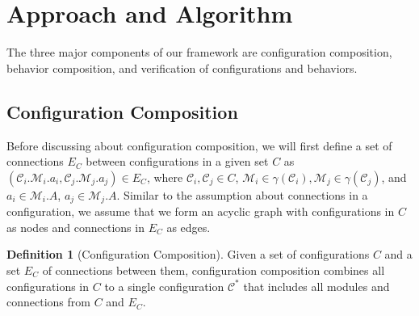 \documentclass[conference]{IEEEtran}
\theoremstyle{definition}
\newtheorem{definition}{Definition}[section]
\begin{document}
\section{Approach and Algorithm}
\label{sec:approach}
The three major components of our framework are configuration composition, behavior
composition, and verification of configurations and behaviors. 
\subsection{Configuration Composition} \label{sec:conf_composition}

Before discussing about configuration composition, we will first define a set of connections $E_C$ between configurations in a given set $C$ as $(\mathcal{C}_i.\mathcal{M}_i.a_i, \mathcal{C}_j.\mathcal{M}_j.a_j) \in E_C$, where $\mathcal{C}_{i},\mathcal{C}_j\in C$, $\mathcal{M}_i \in \gamma(\mathcal{C}_i), \mathcal{M}_j \in \gamma(\mathcal{C}_j)$, and $a_i\in \mathcal{M}_i.A$, $a_j\in \mathcal{M}_j.A$. Similar to the assumption about connections in a configuration, we assume that we form an
acyclic graph with configurations in $C$ as nodes and connections in $E_C$ as edges.
\begin{definition}[Configuration Composition]
Given a set of configurations $C$ %
and a set $E_C$ of connections between them, configuration composition
combines all configurations in $C$ to a single configuration $\mathcal{C}^*$
that
includes all modules and
connections from $C$ and $E_C$.%
\end{definition}
\end{document}
